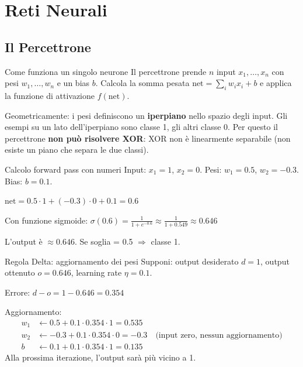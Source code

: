 \documentclass[12pt,a4paper]{article}
\begin{document}
\section{Reti Neurali}

\subsection{Il Percettrone}

\begin{narrativo}{Come funziona un singolo neurone}
Il percettrone prende $n$ input $x_1, \ldots, x_n$ con pesi $w_1, \ldots, w_n$ e un bias $b$. Calcola la somma pesata $\text{net} = \sum_i w_i x_i + b$ e applica la funzione di attivazione $f(\text{net})$.

Geometricamente: i pesi definiscono un \textbf{iperpiano} nello spazio degli input. Gli esempi su un lato dell'iperpiano sono classe 1, gli altri classe 0. Per questo il percettrone \textbf{non può risolvere XOR}: XOR non è linearmente separabile (non esiste un piano che separa le due classi).
\end{narrativo}

\begin{esempio}{Calcolo forward pass con numeri}
Input: $x_1 = 1$, $x_2 = 0$. Pesi: $w_1 = 0.5$, $w_2 = -0.3$. Bias: $b = 0.1$.

$\text{net} = 0.5 \cdot 1 + (-0.3) \cdot 0 + 0.1 = 0.6$

Con funzione sigmoide: $\sigma(0.6) = \frac{1}{1+e^{-0.6}} \approx \frac{1}{1+0.549} \approx 0.646$

L'output è $\approx 0.646$. Se soglia = 0.5 $\Rightarrow$ classe 1.
\end{esempio}

\begin{esempio}{Regola Delta: aggiornamento dei pesi}
Supponi: output desiderato $d = 1$, output ottenuto $o = 0.646$, learning rate $\eta = 0.1$.

Errore: $d - o = 1 - 0.646 = 0.354$

Aggiornamento:
\begin{align*}
w_1 &\leftarrow 0.5 + 0.1 \cdot 0.354 \cdot 1 = 0.535 \\
w_2 &\leftarrow -0.3 + 0.1 \cdot 0.354 \cdot 0 = -0.3 \quad \text{(input zero, nessun aggiornamento)} \\
b   &\leftarrow 0.1 + 0.1 \cdot 0.354 \cdot 1 = 0.135
\end{align*}
Alla prossima iterazione, l'output sarà più vicino a 1.
\end{esempio}
\end{document}
